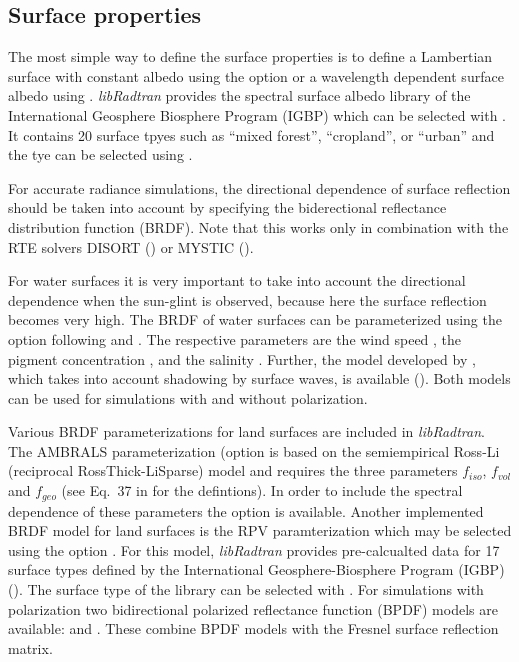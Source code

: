 \subsection{Surface properties}

The most simple way to define the surface properties is to define a Lambertian surface with constant albedo using the option  or a wavelength
dependent surface albedo using . {\sl libRadtran} provides the spectral surface albedo library of the  International Geosphere Biosphere Program (IGBP) which can be selected with . It contains 20 surface tpyes such as ``mixed forest'', ``cropland'', or ``urban'' and the tye can be selected using . 


For accurate radiance simulations, the directional dependence of surface reflection should be taken into account by specifying the biderectional reflectance distribution function (BRDF). Note that this works only in combination with the RTE solvers DISORT () or MYSTIC ().

For water surfaces it is very important to take into account the directional dependence when the sun-glint is observed, because here the surface reflection becomes very high. 
The BRDF of water surfaces can be parameterized using the option  following \citet{cox54a, cox54b} and \citet{nakajima83}.
The respective parameters are the wind speed
, the pigment concentration
, and the salinity
.
Further, the model developed by \citet{Tsang1985}, which takes into account shadowing by surface waves, is available (). Both models can be used for simulations with and without polarization. 

Various BRDF parameterizations for land surfaces are included in {\sl libRadtran}. The AMBRALS parameterization (option  is based on the semiempirical Ross-Li (reciprocal RossThick-LiSparse) model and requires the three parameters $f_{iso}$, $f_{vol}$ and $f_{geo}$ (see Eq.~37 in \citet{lucht2000} for the defintions). In order to include the spectral dependence of these parameters the option  is available. 
Another implemented BRDF model for land surfaces is the RPV paramterization \citep{rahman93a,Degunther2000b} which may be selected using the option . For this model, {\sl libRadtran} provides pre-calcualted data for 17 surface types defined by the International Geosphere-Biosphere Program (IGBP) (). The surface type of the library can be selected with . For simulations with polarization two bidirectional polarized reflectance function (BPDF) models are available:  \citep{Litvinov2012} and  \citep{Maignan2009}. These combine BPDF models with the Fresnel surface reflection matrix. 


